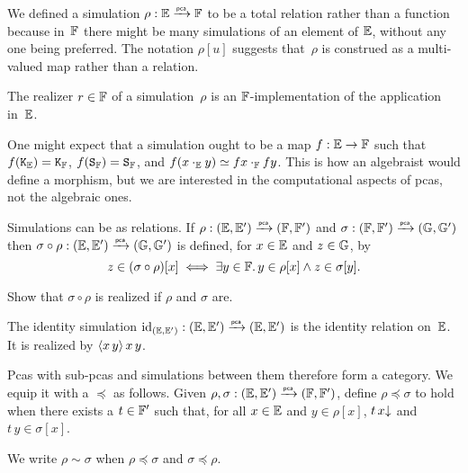 We defined a simulation $\rho : \EE \pcato \FF$ to be a total relation rather than a function because in~$\FF$ there might be many simulations of an element of $\EE$, without any one being preferred. The notation $\rho[u]$ suggests that~$\rho$ is construed as a multi-valued map rather than a relation.

The realizer $r \in \FF$ of a simulation~$\rho$ is an $\FF$-implementation of the application in~$\EE$.

One might expect that a simulation ought to be a map $f : \EE \to \FF$ such that $f(\combK_\EE) = \combK_\FF$, $f(\combS_\FF) = \combS_\FF$, and $f (x \cdot_\EE y) \kleq f x \cdot_\FF f y$. This is how an algebraist would define a morphism, but we are interested in the computational aspects of pcas, not the algebraic ones.

%
%
%
Simulations can be  as relations.
If $\rho: (\EE, \subEE) \pcato (\FF, \subFF)$ and $\sigma: (\FF,
\subFF) \pcato (\GG, \subGG)$ then $\sigma \circ \rho: (\EE, \subEE)
\pcato (\GG, \subGG)$ is defined, for $x \in \EE$ and $z \in \GG$, by
%
\begin{equation*}
  z \in (\sigma \circ \rho)[x]
  \iff
  \some{y \in \FF} y \in \rho[x] \land z \in \sigma[y].
\end{equation*}

\begin{exercise}
  Show that $\sigma \circ \rho$ is realized if $\rho$ and $\sigma$ are.
\end{exercise}

The identity simulation $\id[(\EE, \subEE)]: (\EE,
\subEE) \pcato (\EE, \subEE)$ is the identity relation on~$\EE$. It is realized by $\pcalam{x\,y} x \, y$.

Pcas with sub-pcas and simulations between them therefore form a category. We equip it with a  $\preceq$ as follows.
%
%
%
%
%
Given $\rho, \sigma : (\EE, \subEE) \pcato (\FF, \subFF)$, define $\rho \preceq \sigma$ to hold when
there exists a  $t \in \subFF$ such that, for all $x \in \EE$ and $y \in \rho[x]$, $\defined{t \, x}$ and $t \, y \in \sigma[x]$.

We write $\rho \sim \sigma$ when $\rho \preceq \sigma$ and $\sigma \preceq \rho$.

